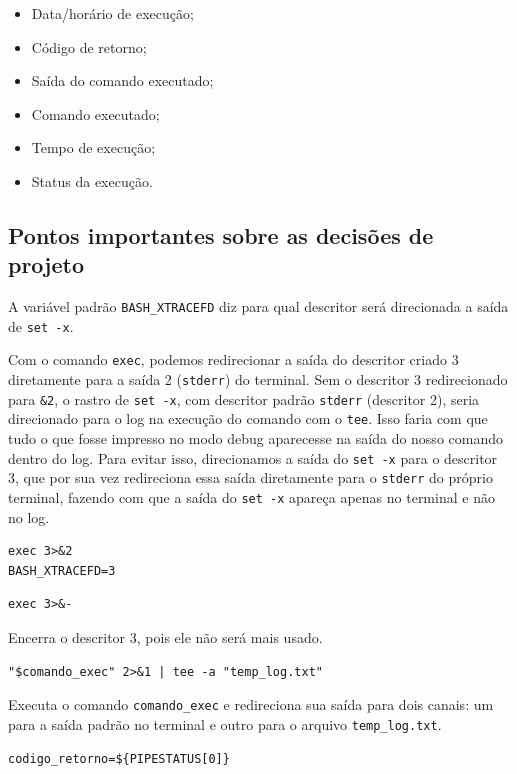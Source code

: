 \documentclass[a4paper]{article}
\begin{document}
\begin{itemize}
    \item Data/horário de execução;
    \item Código de retorno;
    \item Saída do comando executado;
    \item Comando executado;
    \item Tempo de execução;
    \item Status da execução.
\end{itemize}

\subsection*{Pontos importantes sobre as decisões de projeto}

A variável padrão \texttt{BASH\_XTRACEFD} diz para qual descritor será direcionada a saída de \texttt{set -x}.

Com o comando \texttt{exec}, podemos redirecionar a saída do descritor criado 3 diretamente para a saída 2 (\texttt{stderr}) do terminal. Sem o descritor 3 redirecionado para \texttt{\&2}, o rastro de \texttt{set -x}, com descritor padrão \texttt{stderr} (descritor 2), seria direcionado para o log na execução do comando com o \texttt{tee}. Isso faria com que tudo o que fosse impresso no modo debug aparecesse na saída do nosso comando dentro do log. Para evitar isso, direcionamos a saída do \texttt{set -x} para o descritor 3, que por sua vez redireciona essa saída diretamente para o \texttt{stderr} do próprio terminal, fazendo com que a saída do \texttt{set -x} apareça apenas no terminal e não no log.

\begin{verbatim}
exec 3>&2
BASH_XTRACEFD=3
\end{verbatim}

\begin{verbatim}
exec 3>&-
\end{verbatim}

Encerra o descritor 3, pois ele não será mais usado.

\begin{verbatim}
"$comando_exec" 2>&1 | tee -a "temp_log.txt"
\end{verbatim}

Executa o comando \texttt{comando\_exec} e redireciona sua saída para dois canais: um para a saída padrão no terminal e outro para o arquivo \texttt{temp\_log.txt}.

\begin{verbatim}
codigo_retorno=${PIPESTATUS[0]}
\end{verbatim}
\end{document}

